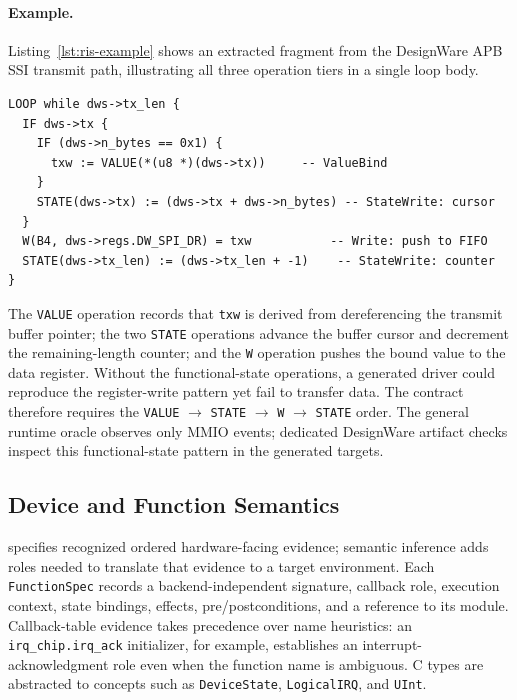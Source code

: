 \paragraph{Example.}

Listing~\ref{lst:ris-example} shows an extracted \rislang{} fragment from the DesignWare APB SSI transmit path, illustrating all three operation tiers in a single loop body.

\begin{lstlisting}[language=ris, caption={\rislang{} fragment from \texttt{dw\_spi\_transfer\_handler}: the SPI transmit loop, showing functional-state operations interleaved with register writes.}, label={lst:ris-example}]
LOOP while dws->tx_len {
  IF dws->tx {
    IF (dws->n_bytes == 0x1) {
      txw := VALUE(*(u8 *)(dws->tx))     -- ValueBind
    }
    STATE(dws->tx) := (dws->tx + dws->n_bytes) -- StateWrite: cursor
  }
  W(B4, dws->regs.DW_SPI_DR) = txw           -- Write: push to FIFO
  STATE(dws->tx_len) := (dws->tx_len + -1)    -- StateWrite: counter
}
\end{lstlisting}

The \texttt{VALUE} operation records that \texttt{txw} is derived from dereferencing the transmit buffer pointer; the two \texttt{STATE} operations advance the buffer cursor and decrement the remaining-length counter; and the \texttt{W} operation pushes the bound value to the data register. Without the functional-state operations, a generated driver could reproduce the register-write pattern yet fail to transfer data. The contract therefore requires the \texttt{VALUE} $\rightarrow$ \texttt{STATE} $\rightarrow$ \texttt{W} $\rightarrow$ \texttt{STATE} order. The general runtime oracle observes only MMIO events; dedicated DesignWare artifact checks inspect this functional-state pattern in the generated targets.

\subsection{Device and Function Semantics}

\rislang{} specifies recognized ordered hardware-facing evidence; semantic
inference adds roles needed to translate that evidence to a target environment.
Each \texttt{FunctionSpec} records a backend-independent signature, callback
role, execution context, state bindings, effects, pre/postconditions, and a
reference to its \rislang{} module. Callback-table evidence takes precedence
over name heuristics: an \texttt{irq\_chip.irq\_ack} initializer, for example,
establishes an interrupt-acknowledgment role even when the function name is
ambiguous. C types are abstracted to concepts such as \texttt{DeviceState},
\texttt{LogicalIRQ}, and \texttt{UInt}.

